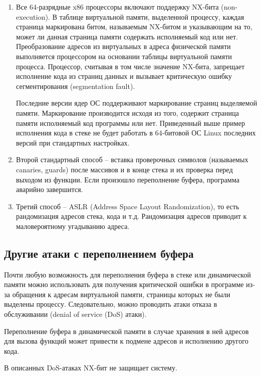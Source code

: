 \begin{enumerate}
    \item Все 64-разрядные x86 процессоры включают поддержку NX-бита (non-execution). В таблице виртуальной памяти, выделенной процессу, каждая страница маркирована битом, называемым NX-битом и указывающим на то, может ли данная страница памяти содержать исполняемый код или нет. Преобразование адресов из виртуальных в адреса физической памяти выполняется процессором на основании таблицы виртуальной памяти процесса. Процессор, считывая в том числе значение NX-бита, запрещает исполнение кода из страниц данных и вызывает критическую ошибку сегментирования (segmentation fault).

        Последние версии ядер ОС поддерживают маркирование страниц выделяемой памяти. Маркирование производится исходя из того, содержит страница памяти исполняемый код программы или нет. Приведенный выше пример исполнения кода в стеке не будет работать в 64-битовой ОС Linux последних версий при стандартных настройках.

    \item Второй стандартный способ -- вставка проверочных символов (называемых canaries, guards) после массивов и в конце стека и их проверка перед выходом из функции. Если произошло переполнение буфера, программа аварийно завершится.

    \item Третий способ -- ASLR (Address Space Layout Randomization), то есть рандомизация адресов стека, кода и т.д. Рандомизация адресов приводит к маловероятному угадыванию адреса.
\end{enumerate}


\subsection{Другие атаки с переполнением буфера}

Почти любую возможность для переполнения буфера в стеке или динамической памяти можно использовать для получения критической ошибки в программе из-за обращения к адресам виртуальной памяти, страницы которых не были выделены процессу. Следовательно, можно проводить атаки отказа в обслуживании (denial of service (DoS) атаки).

Переполнение буфера в динамической памяти в случае хранения в ней адресов для вызова функций может привести к подмене адресов и исполнению другого кода.

В описанных DoS-атаках NX-бит  не защищает систему.
